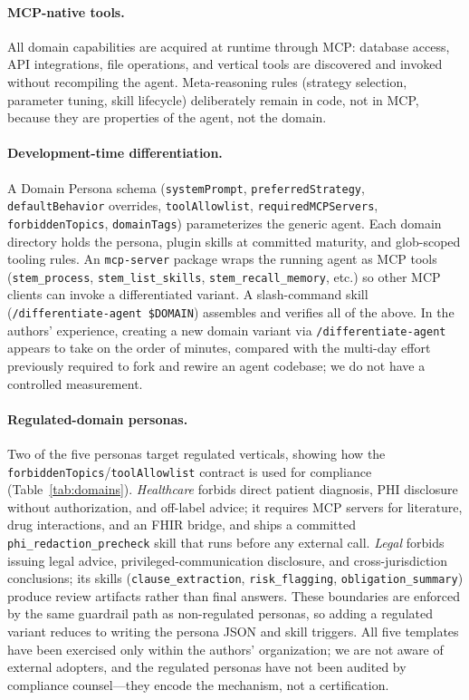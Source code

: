 \documentclass[11pt]{article}
\begin{document}
\paragraph{MCP-native tools.} All domain capabilities are acquired at runtime through MCP: database access, API integrations, file operations, and vertical tools are discovered and invoked without recompiling the agent. Meta-reasoning rules (strategy selection, parameter tuning, skill lifecycle) deliberately remain in code, not in MCP, because they are properties of the agent, not the domain.

\paragraph{Development-time differentiation.} A Domain Persona schema (\texttt{systemPrompt}, \texttt{preferredStrategy}, \texttt{defaultBehavior} overrides, \texttt{toolAllowlist}, \texttt{requiredMCPServers}, \texttt{forbiddenTopics}, \texttt{domainTags}) parameterizes the generic agent. Each domain directory holds the persona, plugin skills at committed maturity, and glob-scoped tooling rules. An \texttt{mcp-server} package wraps the running agent as MCP tools (\texttt{stem\_process}, \texttt{stem\_list\_skills}, \texttt{stem\_recall\_memory}, etc.) so other MCP clients can invoke a differentiated variant. A slash-command skill (\texttt{/differentiate-agent \$DOMAIN}) assembles and verifies all of the above. In the authors' experience, creating a new domain variant via \texttt{/differentiate-agent} appears to take on the order of minutes, compared with the multi-day effort previously required to fork and rewire an agent codebase; we do not have a controlled measurement.

\paragraph{Regulated-domain personas.} Two of the five personas target regulated verticals, showing how the \texttt{forbiddenTopics}/\texttt{toolAllowlist} contract is used for compliance (Table~\ref{tab:domains}). \emph{Healthcare} forbids direct patient diagnosis, PHI disclosure without authorization, and off-label advice; it requires MCP servers for literature, drug interactions, and an FHIR bridge, and ships a committed \texttt{phi\_redaction\_precheck} skill that runs before any external call. \emph{Legal} forbids issuing legal advice, privileged-communication disclosure, and cross-jurisdiction conclusions; its skills (\texttt{clause\_extraction}, \texttt{risk\_flagging}, \texttt{obligation\_summary}) produce review artifacts rather than final answers. These boundaries are enforced by the same guardrail path as non-regulated personas, so adding a regulated variant reduces to writing the persona JSON and skill triggers. All five templates have been exercised only within the authors' organization; we are not aware of external adopters, and the regulated personas have not been audited by compliance counsel---they encode the mechanism, not a certification.
\end{document}
